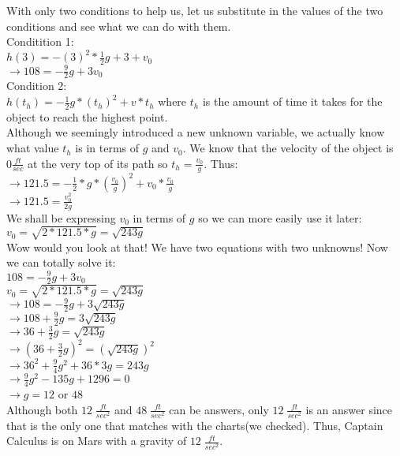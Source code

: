 \documentclass[titlepage]{article}
\begin{document}
With only two conditions to help us, let us substitute in the values of the two conditions and see what we can do with them.\\
Conditition 1:\\
$h(3) = -(3)^2*\frac{1}{2}g+3+v_0$ \\
$\rightarrow 108 = -\frac{9}{2}g+3v_0$\\
Condition 2:\\
$h(t_h) = -\frac{1}{2}g*(t_h)^2+v*t_h$ where $t_h$ is the amount of time it takes for the object to reach the highest point.\\
Although we seemingly introduced a new unknown variable, we actually know what value $t_h$ is in terms of $g$ and $v_0$. We know that the velocity of the object is $0\frac{ft}{sec}$ at the very top of its path so $t_h = \frac{v_0}{g}$. Thus:\\
$\rightarrow 121.5=-\frac{1}{2}*g*(\frac{v_0}{g})^2+v_0*\frac{v_0}{g}$\\
$\rightarrow 121.5 = \frac{v_0^2}{2g}$\\
We shall be expressing $v_0$ in terms of $g$ so we can more easily use it later:\\
$v_0 = \sqrt{2*121.5*g} = \sqrt{243g}$
\\

Wow would you look at that! We have two equations with two unknowns! Now we can totally solve it:\\
$108 = -\frac{9}{2}g+3v_0$\\
$v_0 = \sqrt{2*121.5*g} = \sqrt{243g}$\\
$\rightarrow 108 = -\frac{9}{2}g+3\sqrt{243g}$\\
$\rightarrow 108 +\frac{9}{2}g = 3\sqrt{243g}$\\
$\rightarrow 36 +\frac{3}{2}g = \sqrt{243g}$\\
$\rightarrow (36 +\frac{3}{2}g)^2 = (\sqrt{243g})^2$\\
$\rightarrow 36^2 +\frac{9}{4}g^2 + 36*3g = 243g$\\
$\rightarrow \frac{9}{4}g^2-135g+1296 = 0$\\
$\rightarrow g = 12$ or $48$
\\

Although both $12\;\frac{ft}{sec^2}$ and $48\;\frac{ft}{sec^2}$ can be answers, only $12\;\frac{ft}{sec^2}$ is an answer since that is the only one that matches with the charts(we checked). Thus, Captain Calculus is on Mars with a gravity of $12\;\frac{ft}{sec^2}$.
\end{document}
